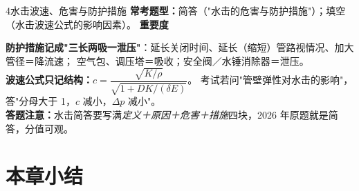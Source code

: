 \begin{kaodian}{4}{水击波速、危害与防护措施}
\textbf{常考题型：}简答（"水击的危害与防护措施"）；填空（水击波速公式的影响因素）。
\textbf{重要度 }\quad{}\quad{}

\begin{banfa}
\textbf{防护措施记成"三长两吸一泄压"}：延长关闭时间、延长（缩短）管路视情况、加大管径＝降流速；
空气包、调压塔＝吸收；安全阀／水锤消除器＝泄压。\\
\textbf{波速公式只记结构：}$c=\dfrac{\sqrt{K/\rho}}{\sqrt{1+DK/(\delta E)}}$。
考试若问"管壁弹性对水击的影响"，答"分母大于 1，$c$ 减小，$\Delta p$ 减小"。\\
\textbf{答题注意：}水击简答要写满\emph{定义＋原因＋危害＋措施}四块，2026 年原题就是简答，分值可观。
\end{banfa}
\end{kaodian}

\section{本章小结}

